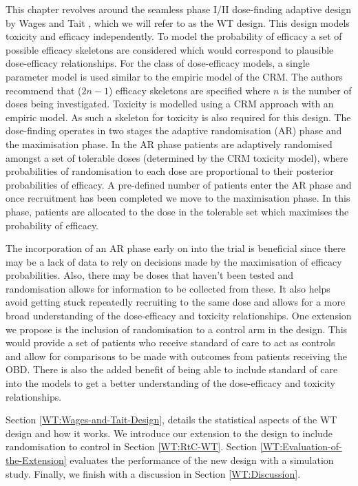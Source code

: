 This chapter revolves around the seamless phase \RN{1}/\RN{2} dose-finding adaptive design by Wages and Tait \cite{wagesSeamlessPhaseII2015}, which we will refer to as the WT design. This design models toxicity and efficacy independently. To model the probability of efficacy a set of possible efficacy skeletons are considered which would correspond to plausible dose-efficacy relationships. For the class of dose-efficacy models, a single parameter model is used similar to the empiric model of the CRM. The authors recommend that ($2n - 1$) efficacy skeletons are specified where $n$ is the number of doses being investigated. Toxicity is modelled using a CRM approach with an empiric model. As such a skeleton for toxicity is also required for this design. The dose-finding operates in two stages the adaptive randomisation (AR) phase and the maximisation phase. In the AR phase patients are adaptively randomised amongst a set of tolerable doses (determined by the CRM toxicity model), where probabilities of randomisation to each dose are proportional to their posterior probabilities of efficacy. A pre-defined number of patients enter the AR phase and once recruitment has been completed we move to the maximisation phase. In this phase, patients are allocated to the dose in the tolerable set which maximises the probability of efficacy.  

The incorporation of an AR phase early on into the trial is beneficial since there may be a lack of data to rely on decisions made by the maximisation of efficacy probabilities. Also, there may be doses that haven't been tested and randomisation allows for information to be collected from these. It also helps avoid getting stuck repeatedly recruiting to the same dose and allows for a more broad understanding of the dose-efficacy and toxicity relationships. One extension we propose is the inclusion of randomisation to a control arm in the design. This would provide a set of patients who receive standard of care to act as controls and allow for comparisons to be made with outcomes from patients receiving the OBD. There is also the added benefit of being able to include standard of care into the models to get a better understanding of the dose-efficacy and toxicity relationships.  

Section \ref{WT:Wages-and-Tait-Design}, details the statistical aspects of the WT design and how it works. We introduce our extension to the design to include randomisation to control in Section \ref{WT:RtC-WT}. Section \ref{WT:Evaluation-of-the-Extension} evaluates the performance of the new design with a simulation study. Finally, we finish with a discussion in Section \ref{WT:Discussion}.  


